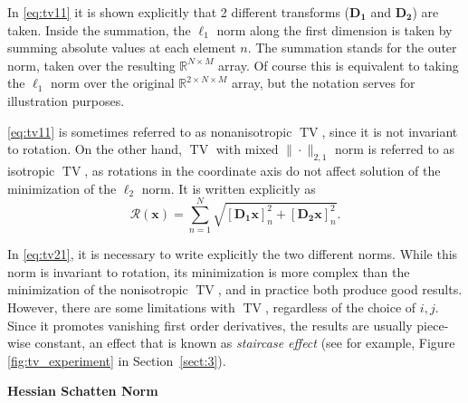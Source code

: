 In \eqref{eq:tv11} it is shown explicitly that 2 different transforms ($\mathbf{D}_\mathbf{1}$ and $\mathbf{D}_\mathbf{2}$) are taken. Inside the summation, the $\ell_1$ norm along the first dimension is taken by summing absolute values at each element $n$. The summation stands for the outer norm, taken over the resulting $\mathbb{R}^{N \times M}$ array. Of course this is equivalent to taking the $\ell_1$ norm over the original $\mathbb{R}^{2 \times N \times M}$ array, but the notation serves for illustration purposes. 

\eqref{eq:tv11} is sometimes referred to as nonanisotropic $\operatorname{TV}$, since it is not invariant to rotation. On the other hand, $\operatorname{TV}$ with mixed $\|\cdot \|_{2, 1}$ norm is referred to as isotropic $\operatorname{TV}$, as rotations in the coordinate axis do not affect solution of the minimization of the $\ell_2$ norm. It is  written explicitly as
\begin{equation}
    \mathcal{R}(\mathbf{x}) = \sum^N_{n = 1}\sqrt{[\mathbf{D_1x}]^2_n + [\mathbf{D_2x}]^2_n}.
    \label{eq:tv21}
\end{equation}

In  \eqref{eq:tv21}, it is necessary to write explicitly the two different norms. While this norm is invariant to rotation, its minimization is more complex than the minimization of the nonisotropic $\operatorname{TV}$, and in practice both produce good results. However, there are some limitations with $\operatorname{TV}$, regardless of the choice of $i, j$.  Since it promotes vanishing first order derivatives, the results are usually piece-wise constant, an effect that is known as \textit{staircase effect} (see for example, Figure \ref{fig:tv_experiment} in Section~\ref{sect:3}).  

\noindent\textbf{Hessian Schatten Norm}

